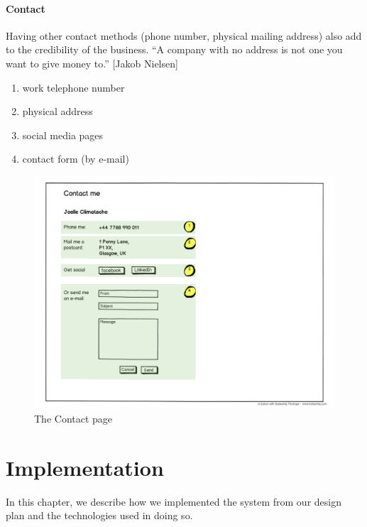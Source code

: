 \documentclass{l3proj}
\begin{document}
\subsubsection{Contact}
Having other contact methods (phone number, physical mailing address) also add
to the credibility of the business. ``A company with no address is not one you
want to give money to.'' [Jakob Nielsen]
\begin{enumerate} \itemsep1pt \parskip0pt 
	\item work telephone number
	\item physical address
	\item social media pages
	\item contact form (by e-mail)
\end{enumerate}

\begin{figure}
\label{wireframes:contact}
\begin{center}
\includegraphics[width=\linewidth, trim = 0px 40px 0px 220px]
	{wireframes/contact}
\caption{The Contact page}
\end{center}
\end{figure}


\chapter{Implementation}
\label{chap:impl}

In this chapter, we describe how we implemented the system from our design plan and the technologies used in doing so.
\end{document}
